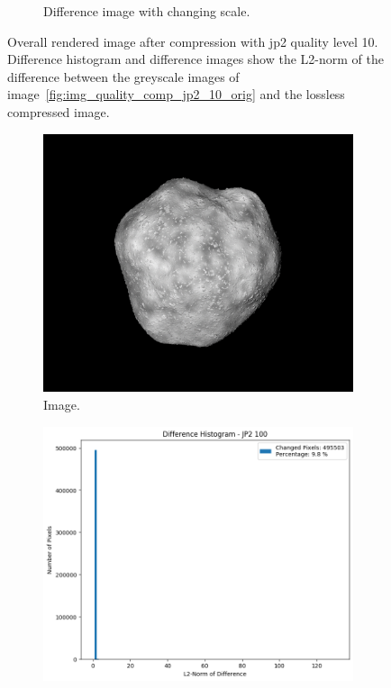 \begin{figure}[htb]
\begin{subfigure}[b]{0.48\textwidth}
        \caption{Difference image with changing scale.}
        \label{fig:img_quality_comp_jp2_10_diff_rel}
    \end{subfigure}
    \caption{Overall rendered image after compression with \gls{jp2} quality level 10. Difference histogram and difference images show the L2-norm of the difference between the greyscale images of image~\ref{fig:img_quality_comp_jp2_10_orig} and the lossless compressed image.}
    \label{fig:img_quality_comp_jp2_10}
\end{figure}

\begin{figure}[htb]
    \centering
    \begin{subfigure}[b]{0.48\textwidth}
        \centering
        \includegraphics[width=\textwidth]{doc/thesis/0_figures/compare_quality/set1/jp2_100.png}
        \caption{Image.}
        \label{fig:img_quality_comp_jp2_100_orig}
    \end{subfigure}
    \begin{subfigure}[b]{0.48\textwidth}
        \centering
        \includegraphics[width=\textwidth]{doc/thesis/0_figures/compare_quality/set1/jp2_100_diff_histogram.png}

\end{subfigure}
\end{figure}
